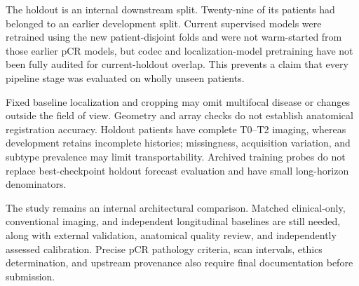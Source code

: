 The holdout is an internal downstream split. Twenty-nine of its patients had belonged to an earlier development split. Current supervised models were retrained using the new patient-disjoint folds and were not warm-started from those earlier pCR models, but codec and localization-model pretraining have not been fully audited for current-holdout overlap. This prevents a claim that every pipeline stage was evaluated on wholly unseen patients.

Fixed baseline localization and cropping may omit multifocal disease or changes outside the field of view. Geometry and array checks do not establish anatomical registration accuracy. Holdout patients have complete T0--T2 imaging, whereas development retains incomplete histories; missingness, acquisition variation, and subtype prevalence may limit transportability. Archived training probes do not replace best-checkpoint holdout forecast evaluation and have small long-horizon denominators.

The study remains an internal architectural comparison. Matched clinical-only, conventional imaging, and independent longitudinal baselines are still needed, along with external validation, anatomical quality review, and independently assessed calibration. Precise pCR pathology criteria, scan intervals, ethics determination, and upstream provenance also require final documentation before submission.
